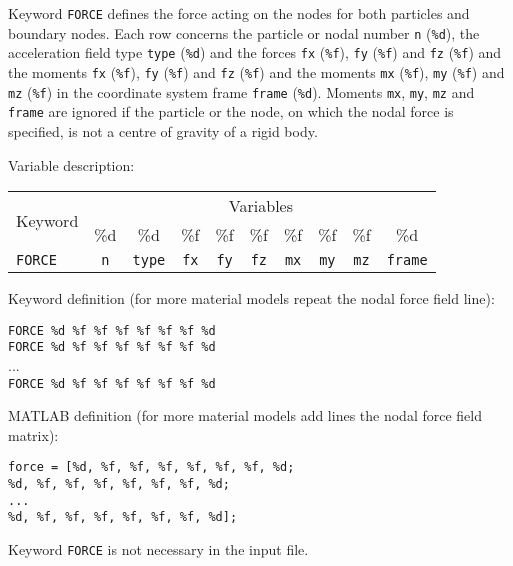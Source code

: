 Keyword \texttt{FORCE} defines the force acting on the nodes for both particles and boundary nodes. Each row concerns the particle or nodal number \texttt{n} (\texttt{\%d}), the acceleration field type \texttt{type} (\texttt{\%d}) and the forces \texttt{fx} (\texttt{\%f}), \texttt{fy} (\texttt{\%f}) and \texttt{fz} (\texttt{\%f}) and the moments \texttt{fx} (\texttt{\%f}), \texttt{fy} (\texttt{\%f}) and \texttt{fz} (\texttt{\%f}) and the moments \texttt{mx} (\texttt{\%f}), \texttt{my} (\texttt{\%f}) and \texttt{mz} (\texttt{\%f}) in the coordinate system frame \texttt{frame} (\texttt{\%d}). Moments \texttt{mx}, \texttt{my}, \texttt{mz} and \texttt{frame} are ignored if the particle or the node, on which the nodal force is specified, is not a centre of gravity of a rigid body.

Variable description:

\begin{tabular}{|l|c|c|c|c|c|c|c|c|c|}
\hline
\multirow{2}{*}{Keyword} & \multicolumn{9}{c|}{Variables} \\ \cline{2-10}
& \%d & \%d & \%f & \%f & \%f & \%f & \%f & \%f & \%d \\ \hline
\texttt{FORCE} & \texttt{n} & \texttt{type} & \texttt{fx} & \texttt{fy} & \texttt{fz} & \texttt{mx} & \texttt{my} & \texttt{mz} & \texttt{frame} \\ \hline
\end{tabular}

Keyword definition (for more material models repeat the nodal force field line):

\begin{tcolorbox}
\texttt{FORCE \%d \%f \%f \%f \%f \%f \%f \%d} \\
\texttt{FORCE \%d \%f \%f \%f \%f \%f \%f \%d} \\
... \\
\texttt{FORCE \%d \%f \%f \%f \%f \%f \%f \%d}
\end{tcolorbox}

MATLAB definition (for more material models add lines the nodal force field matrix):

\begin{tcolorbox}
\texttt{force = [\%d, \%f, \%f, \%f, \%f, \%f, \%f, \%d; \\
\%d, \%f, \%f, \%f, \%f, \%f, \%f, \%d; \\
... \\
\%d, \%f, \%f, \%f, \%f, \%f, \%f, \%d];}
\end{tcolorbox}

Keyword \texttt{FORCE} is not necessary in the input file.

